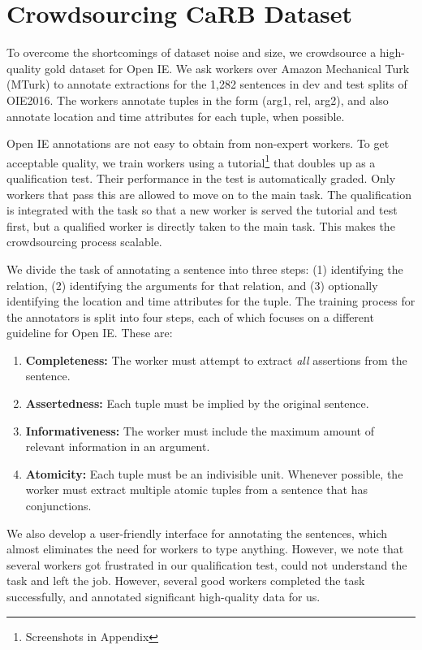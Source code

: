\section{Crowdsourcing CaRB Dataset}

    To overcome the shortcomings of dataset noise and size, we crowdsource a high-quality gold dataset for Open IE. We ask  workers over Amazon Mechanical Turk (MTurk) to annotate extractions for the 1,282 sentences in dev and test splits of OIE2016. The workers annotate tuples in the form (arg1, rel, arg2), and also annotate location and time attributes for each tuple, when possible. 

    Open IE annotations are not easy to obtain from non-expert workers. To get acceptable quality,  we train workers using a tutorial\footnote{Screenshots in Appendix}  that doubles up as a qualification test. Their performance in the test is automatically graded. Only workers that pass this are allowed to move on to the main task. The qualification is integrated with the task so that a new worker is served the tutorial and test first, but a qualified worker is directly taken to the main task. This makes the crowdsourcing process scalable. 

    We divide the task of annotating a sentence into three steps: (1) identifying the relation, (2) identifying the arguments for that relation, and (3) optionally identifying the location and time attributes for the tuple.  The training process for the annotators is split into four steps,  each of which focuses on a different guideline for Open IE. These are:

    \begin{enumerate}%
        \item {\bf Completeness:} The worker must attempt to extract {\em all} assertions from the sentence.
        \item {\bf Assertedness:} Each tuple must be implied by the original sentence.
        \item {\bf Informativeness:} The worker must include the maximum amount of relevant information in an argument.
        \item {\bf Atomicity:} Each tuple must be an indivisible unit. Whenever possible, the worker must extract multiple atomic tuples from a sentence that has conjunctions. 
    \end{enumerate}
    
    We also develop a user-friendly interface for annotating the sentences, which almost eliminates the need for workers to type anything. 
    However, we note that several workers got frustrated in our qualification test, could not understand the task and left the job. However, several good workers completed the task successfully, and annotated significant high-quality data for us.
    
